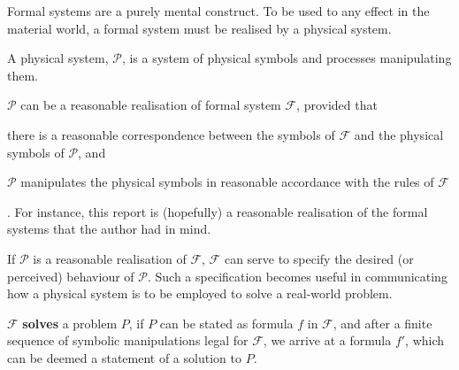 

Formal systems are a purely mental construct. To be used to any effect in the
material world, a formal system must be realised by a physical system.



\begin{notion}

A physical system, $\mathcal{P}$, is a system of physical symbols and processes
manipulating them.

\end{notion}

$\mathcal{P}$ can be a reasonable realisation of formal system $\mathcal{F}$,
provided that\begin{inparaenum}[(1)]\item there is a reasonable correspondence
between the symbols of $\mathcal{F}$ and the physical symbols of $\mathcal{P}$,
and \item $\mathcal{P}$ manipulates the physical symbols in reasonable
accordance with the rules of $\mathcal{F}$\end{inparaenum}. For instance, this
report is (hopefully) a reasonable realisation of the formal systems that the
author had in mind.

If $\mathcal{P}$ is a reasonable realisation of $\mathcal{F}$, $\mathcal{F}$
can serve to specify the desired (or perceived) behaviour of $\mathcal{P}$.
Such a specification becomes useful in communicating how a physical system is
to be employed to solve a real-world problem.

\begin{notion}

$\mathcal{F}$ \textbf{solves} a problem $P$, if $P$ can be stated as formula
$f$ in $\mathcal{F}$, and after a finite sequence of symbolic manipulations
legal for $\mathcal{F}$, we arrive at a formula $f'$, which can be deemed a
statement of a solution to $P$.

\end{notion}

